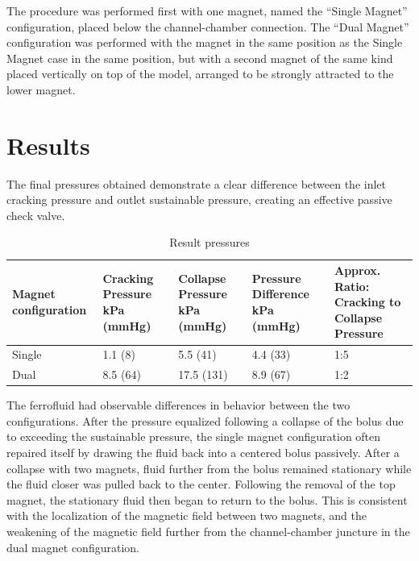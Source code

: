\documentclass{asme2ej}
\begin{document}
The procedure was performed first with one magnet, named the “Single
Magnet” configuration, placed below the channel-chamber connection.
The “Dual Magnet” configuration was performed with the magnet in the
same position as the Single Magnet case in the same position, but with
a second magnet of the same kind placed vertically on top of the model,
arranged to be strongly attracted to the lower magnet.

\section{Results}
The final pressures obtained demonstrate a clear difference between
the inlet cracking pressure and outlet sustainable pressure, creating
an effective passive check valve.

\begin{table}[t]
\footnotesize
\caption{Result pressures}
\begin{center}
\label{table_ASME}
\begin{tabular}{|p{0.3in} |p{0.4in} |p{0.49in} |p{0.45in} |p{0.6in} |}
\hline
Magnet configuration &
Cracking Pressure kPa  (mmHg) &
Collapse Pressure kPa  (mmHg) &
Pressure Difference kPa  (mmHg) &
Approx. Ratio: Cracking to Collapse Pressure \\
\hline
Single &
1.1 (8) &
5.5 (41) &
4.4 (33) &
1:5 \\
\hline
Dual &
8.5 (64) &
17.5 (131)&
8.9 (67)&
1:2 \\
\hline
\end{tabular}
\end{center}
\end{table}


The ferrofluid had observable differences in behavior between the two
configurations.  After the pressure equalized
following a collapse of the bolus due to
exceeding the sustainable pressure, the single magnet
configuration often repaired itself by drawing the fluid back
into a centered bolus passively.
After a collapse with two magnets, fluid further from the bolus
remained stationary while the fluid closer was pulled back to the
center. Following the removal of the top magnet, the stationary fluid
then began to return to the bolus. This is consistent with the
localization of the magnetic field between two magnets, and the
weakening of the magnetic field further from the channel-chamber
juncture in the dual magnet configuration.
\end{document}

